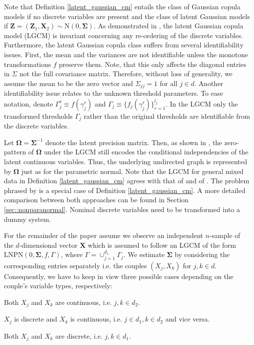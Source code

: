 Note that Definition \ref{latent_gaussian_cm} entails the class of Gaussian copula models if no discrete variables are present and the class of latent Gaussian models if $\mathbf{Z} = (\mathbf{Z}_1, \mathbf{X}_2) \sim \text{N}(0, \mathbf{\Sigma})$. As demonstrated in \cite{Fan17}, the latent Gaussian copula model (LGCM) is invariant concerning any re-ordering of the discrete variables. Furthermore, the latent Gaussian copula class suffers from several identifiability issues. First, the mean and the variances are not identifiable unless the monotone transformations \(f\) preserve them. Note, that this only affects the diagonal entries in \(\Sigma\) not the full covariance matrix. Therefore, without loss of generality, we assume the mean to be the zero vector and \(\Sigma_{jj} = 1\) for all \(j \in d\). Another identifiability issue relates to the unknown threshold parameters. To ease notation, denote \(\Gamma_j^r \equiv f(\gamma_j^r)\) and \(\Gamma_j \equiv \{f_j(\gamma_j^r)\}_{r=1}^{l_j}\). In the LGCM only the transformed thresholds \(\Gamma_j\) rather than the original thresholds are identifiable from the discrete variables.

Let $\mathbf{\Omega}= \mathbf{\Sigma}^{-1}$ denote the latent precision matrix. Then, as shown in \citet{Liu09}, the zero-pattern of $\mathbf{\Omega}$ under the LGCM still encodes the conditional independencies of the latent continuous variables. Thus, the underlying undirected graph is represented by $\mathbf{\Omega}$ just as for the parametric normal. Note that the LGCM for general mixed data in Definition \ref{latent_gaussian_cm} agrees with that of \citet{Quan18} and of \citet{Feng19}. The problem phrased by \citet{Fan17} is a special case of  Definition \ref{latent_gaussian_cm}. A more detailed comparison between both approaches can be found in Section \ref{sec::nonparanormal}. Nominal discrete variables need to be transformed into a dummy system.

For the remainder of the paper assume we observe an independent $n$-sample of the $d$-dimensional vector $\mathbf{X}$ which is assumed to follow an LGCM of the form \(\text{LNPN}(0, \mathbf{\Sigma}, f, \Gamma)\), where \(\Gamma = \cup_{j=1}^{d_1}\Gamma_j\). We estimate $\mathbf{\Sigma}$ by considering the corresponding entries separately i.e. the couples $(X_j, X_k)$ for \(j,k \in d\). Consequently, we have to keep in view three possible cases depending on the couple's variable types, respectively:

\begin{description}[labelwidth=4em,leftmargin =\dimexpr\labelwidth+\labelsep\relax, font=\mdseries]
    \item[\textit{Case I}:] Both $X_j$ and $X_k$ are continuous, i.e. $j,k \in d_2$.
    \item[\textit{Case II}:] $X_j$ is discrete and $X_k$ is continuous, i.e. \(j\in d_1, k\in d_2\) and vice versa.
    \item[\textit{Case III}:] Both $X_j$ and $X_k$ are discrete, i.e. $j,k \in d_1$.
\end{description}

